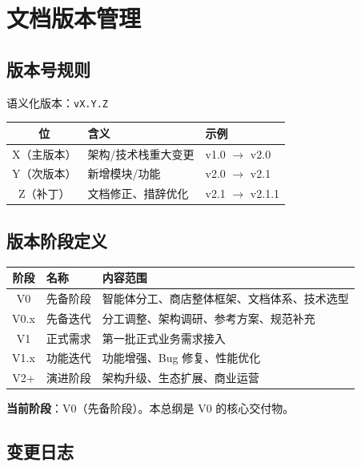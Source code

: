 \documentclass[11pt,a4paper]{article}
\begin{document}
\section{文档版本管理}

\subsection{版本号规则}

语义化版本：\texttt{vX.Y.Z}

\begin{table}[h]
\centering
\begin{tabular}{cll}
\toprule
\textbf{位} & \textbf{含义} & \textbf{示例} \\
\midrule
X（主版本） & 架构/技术栈重大变更 & v1.0 $\to$ v2.0 \\
Y（次版本） & 新增模块/功能 & v2.0 $\to$ v2.1 \\
Z（补丁） & 文档修正、措辞优化 & v2.1 $\to$ v2.1.1 \\
\bottomrule
\end{tabular}
\end{table}

\subsection{版本阶段定义}

\begin{table}[h]
\centering
\begin{tabular}{clp{6cm}}
\toprule
\textbf{阶段} & \textbf{名称} & \textbf{内容范围} \\
\midrule
V0 & 先备阶段 & 智能体分工、商店整体框架、文档体系、技术选型 \\
V0.x & 先备迭代 & 分工调整、架构调研、参考方案、规范补充 \\
V1 & 正式需求 & 第一批正式业务需求接入 \\
V1.x & 功能迭代 & 功能增强、Bug 修复、性能优化 \\
V2+ & 演进阶段 & 架构升级、生态扩展、商业运营 \\
\bottomrule
\end{tabular}
\end{table}

\textbf{当前阶段}：V0（先备阶段）。本总纲是 V0 的核心交付物。

\subsection{变更日志}
\end{document}
